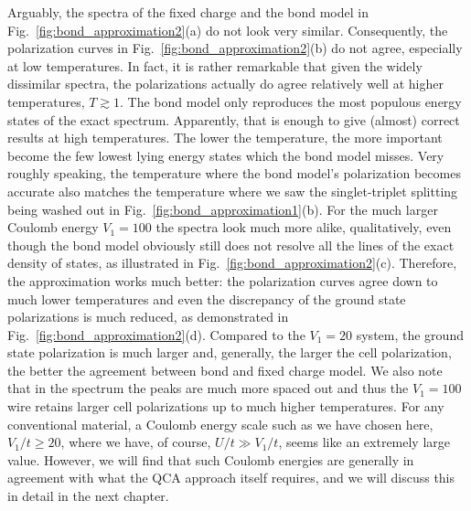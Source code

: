 Arguably, the spectra of the fixed charge and the bond model in
Fig.~\ref{fig:bond_approximation2}(a) do not look very similar. Consequently,
the polarization curves in Fig.~\ref{fig:bond_approximation2}(b) do not agree,
especially at low temperatures. In fact, it is rather remarkable that given the
widely dissimilar spectra, the polarizations actually do agree relatively well
at higher temperatures, $T \gtrsim 1$. The bond model only reproduces the most
populous energy states of the exact spectrum. Apparently, that is enough to give
(almost) correct results at high temperatures. The lower the temperature, the
more important become the few lowest lying energy states which the bond model
misses. Very roughly speaking, the temperature where the bond model's
polarization becomes accurate also matches the temperature where we saw the
singlet-triplet splitting being washed out in
Fig.~\ref{fig:bond_approximation1}(b). For the much larger Coulomb energy $V_1 =
100$ the spectra look much more alike, qualitatively, even though the bond model
obviously still does not resolve all the lines of the exact density of states,
as illustrated in Fig.~\ref{fig:bond_approximation2}(c). Therefore, the
approximation works much better: the polarization curves agree down to much
lower temperatures and even the discrepancy of the ground state polarizations is
much reduced, as demonstrated in Fig.~\ref{fig:bond_approximation2}(d).
Compared to the $V_1 = 20$ system, the ground state polarization is much larger
and, generally, the larger the cell polarization, the better the agreement
between bond and fixed charge model. We also note that in the spectrum the peaks
are much more spaced out and thus the $V_1 = 100$ wire retains larger cell
polarizations up to much higher temperatures. For any conventional material, a
Coulomb energy scale such as we have chosen here, $V_1/t \ge 20$, where we have,
of course, $U/t \gg V_1/t$, seems like an extremely large value. However, we
will find that such Coulomb energies are generally in agreement with what the
QCA approach itself requires, and we will discuss this in detail in the next
chapter.

